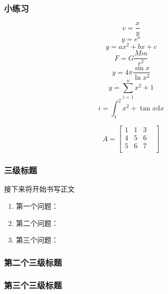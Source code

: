 \documentclass[UTF8]{ctexart}
\begin{document}
	\subsubsection{小练习}
	\begin{equation}
		v=\frac{x}{y}
	\end{equation}
	\begin{equation}
		y=e^{x}
	\end{equation}
	\begin{equation}
		y=ax^2+bx+c
	\end{equation}
	\begin{equation}
		F=G\frac{Mm}{r^2}
	\end{equation}
	\begin{equation}
		y=4\pi \frac{\sin{x}}{\ln{x^2}}
	\end{equation}
	\begin{equation}
		y=\sum^{n}_{i=1} x^2+1
	\end{equation}
	\begin{equation}
		i=\int_{1}^{2}x^2+\tan{x}\mathrm{d}x
	\end{equation}
	
	\begin{equation}
		A=\begin{bmatrix}
			1&1&3\\4&5&6\\5&6&7&\\
		\end{bmatrix}
	\end{equation}
	\subsubsection{三级标题}
	
	接下来将开始书写正文
	\begin{enumerate}
		\item 第一个问题：
		\item 第二个问题：
		\item 第三个问题：
	\end{enumerate}
	
	\subsubsection{第二个三级标题}
	
	
	\subsubsection{第三个三级标题}
	
\end{document}
